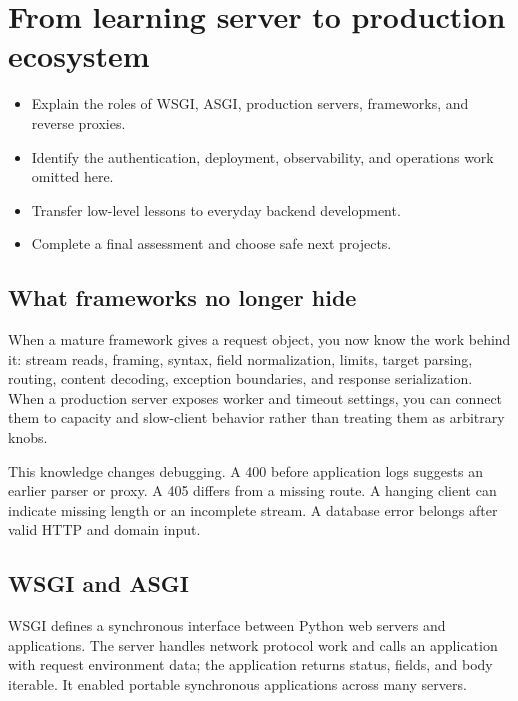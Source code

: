 \chapter{From learning server to production ecosystem}

\begin{objectives}
\begin{itemize}
  \item Explain the roles of WSGI, ASGI, production servers, frameworks, and reverse proxies.
  \item Identify the authentication, deployment, observability, and operations work omitted here.
  \item Transfer low-level lessons to everyday backend development.
  \item Complete a final assessment and choose safe next projects.
\end{itemize}
\end{objectives}

\section{What frameworks no longer hide}

When a mature framework gives a request object, you now know the work behind it:
stream reads, framing, syntax, field normalization, limits, target parsing, routing,
content decoding, exception boundaries, and response serialization. When a
production server exposes worker and timeout settings, you can connect them to
capacity and slow-client behavior rather than treating them as arbitrary knobs.

This knowledge changes debugging. A 400 before application logs suggests an
earlier parser or proxy. A 405 differs from a missing route. A hanging client can
indicate missing length or an incomplete stream. A database error belongs after
valid HTTP and domain input.

\section{WSGI and ASGI}

WSGI defines a synchronous interface between Python web servers and applications.
The server handles network protocol work and calls an application with request
environment data; the application returns status, fields, and body iterable.
It enabled portable synchronous applications across many servers.

